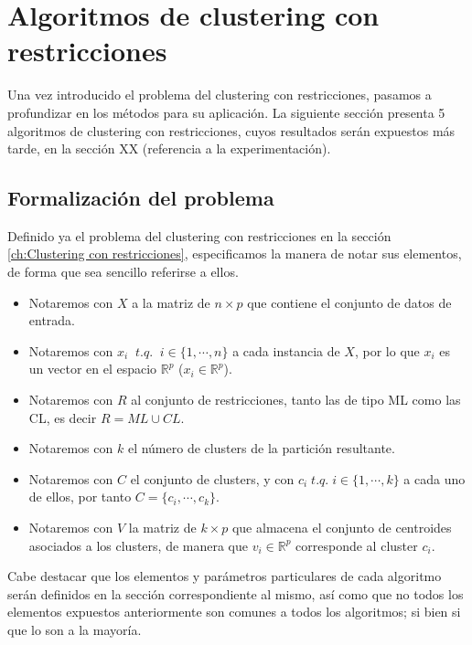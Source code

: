 \chapter{Algoritmos de clustering con restricciones}\label{ch:Algoritmos}

Una vez introducido el problema del clustering con restricciones, pasamos a profundizar en los métodos para su aplicación. La siguiente sección presenta 5 algoritmos de clustering con restricciones, cuyos resultados serán expuestos más tarde, en la sección XX (referencia a la experimentación).

\section{Formalización del problema}

Definido ya el problema del clustering con restricciones en la sección \ref{ch:Clustering con restricciones}, especificamos la manera de notar sus elementos, de forma que sea sencillo referirse a ellos.

\begin{itemize}
	
	\item Notaremos con $X$ a la matriz de $n\times p$ que contiene el conjunto de datos de entrada.
	
	\item Notaremos con $x_i \;\; t.q. \;\; i \in \{1, \cdots, n\}$ a cada instancia de $X$, por lo que $x_i$ es un vector en el espacio $\mathbb{R}^p$ ($x_i \in \mathbb{R}^p$).
	
	\item Notaremos con $R$ al conjunto de restricciones, tanto las de tipo \acs{ML} como las \acs{CL}, es decir $R = ML \cup CL$. 
	
	\item Notaremos con $k$ el número de clusters de la partición resultante.
	
	\item Notaremos con $C$ el conjunto de clusters, y con $c_i \; t.q. \; i \in \{1, \cdots, k\}$ a cada uno de ellos, por tanto $C = \{c_i, \cdots, c_k\}$.
	
	\item Notaremos con $V$ la matriz de $k\times p$ que almacena el conjunto de centroides asociados a los clusters, de manera que $v_i \in \mathbb{R}^p$ corresponde al cluster $c_i$.
	
\end{itemize}
Cabe destacar que los elementos y parámetros particulares de cada algoritmo serán definidos en la sección correspondiente al mismo, así como que no todos los elementos expuestos anteriormente son comunes a todos los algoritmos; si bien si que lo son a la mayoría.

